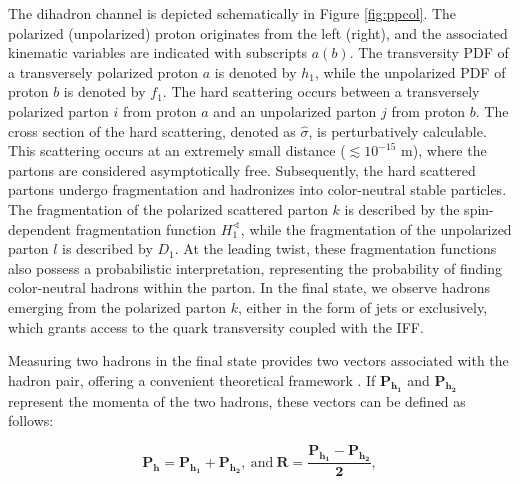 
The dihadron channel is depicted schematically in Figure \ref{fig:ppcol}. The polarized (unpolarized) proton originates from the left (right), and the associated kinematic variables are indicated with subscripts $a(b)$. The transversity PDF of a transversely polarized proton $a$ is denoted by $h_1$, while the unpolarized PDF of proton $b$ is denoted by $f_1$. The hard scattering occurs between a transversely polarized parton $i$ from proton $a$ and an unpolarized parton $j$ from proton $b$. The cross section of the hard scattering, denoted as $\hat{\sigma}$, is perturbatively calculable. This scattering occurs at an extremely small distance ($\lesssim 10^{-15}$ m), where the partons are considered asymptotically free. Subsequently, the hard scattered partons undergo fragmentation and hadronizes into color-neutral stable particles. The fragmentation of the polarized scattered parton $k$ is described by the spin-dependent fragmentation function $H^\sphericalangle_1$, while the fragmentation of the unpolarized parton $l$ is described by $D_1$. At the leading twist, these fragmentation functions also possess a probabilistic interpretation, representing the probability of finding color-neutral hadrons within the parton. In the final state, we observe hadrons emerging from the polarized parton $k$, either in the form of jets or exclusively, which grants access to the quark transversity coupled with the IFF.

Measuring two hadrons in the final state provides two vectors associated with the hadron pair, offering a convenient theoretical framework \cite{Bacchetta:2003vn}. If $\mathbf{P_{h_1}}$ and $\mathbf{P_{h_2}}$ represent the momenta of the two hadrons, these vectors can be defined as follows:

\begin{equation}
\mathbf{P_h} = \mathbf{P_{h_1}} + \mathbf{P_{h_2}},\ \mathrm{and}\ \mathbf{R} = \mathbf{\frac{P_{h_1} - P_{h_2}}{2}},
\end{equation}

